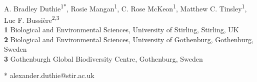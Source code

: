 \documentclass[10pt,letterpaper]{article}
\begin{document}
\vspace*{0.2in}

\begin{flushleft}
{\Large
\textbf{} %
}
\newline
\\
A. Bradley Duthie\textsuperscript{1*},
Rosie Mangan\textsuperscript{1},
C. Rose McKeon\textsuperscript{1},
Matthew C. Tinsley\textsuperscript{1},
Luc F. Bussi\`{e}re\textsuperscript{2,3}
\\
\bigskip
\textbf{1} Biological and Environmental Sciences, University of Stirling, Stirling, UK
\\
\textbf{2} Biological and Environmental Sciences, University of Gothenburg, Gothenburg, Sweden
\\
\textbf{3} Gothenburgh Global Biodiversity Centre, Gothenburg, Sweden
\\
\bigskip

% 
%





* alexander.duthie@stir.ac.uk

\end{flushleft}
\end{document}
